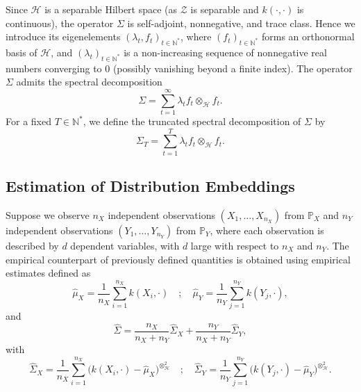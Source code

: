 \documentclass[twoside,11pt]{article}
\newcommand{\Hk}{\mathcal{H}}
\begin{document}
Since $\Hk$ is a separable Hilbert space (as $\mathcal{Z}$ is separable and $k(\cdot,\cdot)$ is continuous), the operator $\Sigma$ is self-adjoint, nonnegative, and trace class. Hence we introduce its eigenelements $(\lambda_t, f_t)_{t \in \mathbb{N}^*}$, where $(f_t)_{t \in \mathbb{N}^*}$ forms an orthonormal basis of $\Hk$, and $(\lambda_t)_{t \in \mathbb{N}^*}$ is a non-increasing sequence of nonnegative real numbers converging to $0$ (possibly vanishing beyond a finite index). The operator $\Sigma$ admits the spectral decomposition 
$$\Sigma = \sum_{t=1}^{\infty} \lambda_t f_t \otimes_{\Hk} f_t.$$ 
For a fixed $T \in \mathbb{N}^*$, we define the truncated spectral decomposition of $\Sigma$ by
$$\Sigma_{T} = \sum_{t=1}^{T} \lambda_t f_t \otimes_{\Hk} f_t.$$

\subsection{Estimation of Distribution Embeddings}
Suppose we observe $n_X$ independent observations $(X_1,\ldots,X_{n_X})$ from $\mathbb{P}_X$ and $n_Y$ independent observations $(Y_1,\ldots,Y_{n_Y})$ from $\mathbb{P}_Y$, where each observation is described by $d$ dependent variables, with $d$ large with respect to $n_X$ and $n_Y$. 
The empirical counterpart of previously defined quantities is obtained using  empirical estimates defined as
\begin{equation*}
    \widehat{\mu}_X = \frac{1}{n_X} \underset{i=1}{\overset{n_X}{\sum}} k(X_i,\cdot) \quad ; \quad \widehat{\mu}_Y = \frac{1}{n_Y} \underset{j=1}{\overset{n_Y}{\sum}} k(Y_j,\cdot),
\end{equation*}
and 
\begin{equation}
     \widehat{\Sigma} = \frac{n_X}{n_X+n_Y} \widehat{\Sigma}_{X} + \frac{n_Y}{n_X+n_Y} \widehat{\Sigma}_{Y},
    \label{emprical_SW}
\end{equation}
with 
$$  \widehat{\Sigma}_{X} = \frac{1}{n_X} \underset{i=1}{\overset{n_X}{\sum}} \Big(k(X_i,\cdot)-\widehat{\mu}_X\Big)^{\otimes^2_{\Hk}} \quad ; \quad \widehat{\Sigma}_{Y} = \frac{1}{n_Y} \underset{j=1}{\overset{n_Y}{\sum}} \Big(k(Y_j,\cdot)-\widehat{\mu}_Y\Big)^{\otimes^2_{\Hk}}.$$
\end{document}
